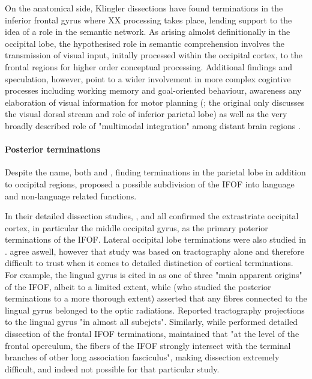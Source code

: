 On the anatomical side, Klingler dissections have found terminations in the inferior frontal gyrus where XX processing takes place, lending support to the idea of a role in the semantic network.
As arising almolst definitionally in the occipital lobe, the hypothesised role in semantic comprehension involves the transmission of visual input, initally processed within the occipital cortex, to the frontal regions for higher order conceptual processing.
Additional findings and speculation, however, point to a wider involvement in more complex cogintive processes including working memory and goal-oriented behaviour, awareness any elaboration of visual information for motor planning (\autocite{Sarubbo2013}; the original \autocite{Rizzolatti2003} only discusses the visual dorsal stream and role of inferior parietal lobe) as well as the very broadly described role of "multimodal integration" among distant brain regions \autocite{Sarubbo2013}.

\paragraph*{Posterior terminations}

Despite the name, both \textcite{Sarubbo2013} and \textcite{Martino2010}, finding terminations in the parietal lobe in addition to occipital regions, proposed a possible subdivision of the IFOF into language and non-language related functions.

In their detailed dissection studies, \textcite{Martino2010}, and \textcite{Sarubbo2013} all confirmed the extrastriate occipital cortex, in particular the middle occipital gyrus, as the primary poterior terminations of the IFOF. Lateral occipital lobe terminations were also studied in \textcite{Palejwala2020}.
\textcite{Hau2016} agree aswell, however that study was based on tractography alone and therefore difficult to trust when it comes to detailed distinction of cortical terminations.
For example, the lingual gyrus is cited in \textcite{Sarubbo2013} as one of three "main apparent origins" of the IFOF, albeit to a limited extent, while \textcite{Martino2010} (who studied the posterior terminations to a more thorough extent) asserted that any fibres connected to the lingual gyrus belonged to the optic radiations. \textcite{Hau2016} Reported tractography projections to the lingual gyrus "in almost all subejcts".
Similarly, while \textcite{Sarubbo2013} performed detailed dissection of the frontal IFOF terminations, \textcite{Martino2010} maintained that "at the level of the frontal operculum, the fibers of the IFOF strongly intersect with the terminal branches of other long association fasciculus", making dissection extremely difficult, and indeed not possible for that particular study.

